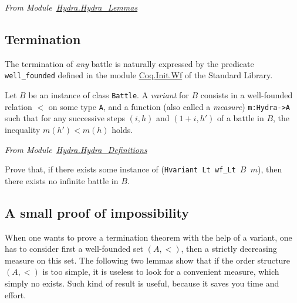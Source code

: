 \vspace{4pt}
\emph{From Module~\href{../theories/html/hydras.Hydra.Hydra_Lemmas.html\#next_round_dec}{Hydra.Hydra\_Lemmas}}



\subsection{Termination}

The termination of \emph{any}  battle is naturally expressed by the predicate \texttt{well\_founded} defined in the module \href{https://coq.inria.fr/distrib/current/stdlib/Coq.Init.Wf.html}{Coq.Init.Wf} 
 of the Standard Library.






Let $B$ be an instance of class \texttt{Battle}. A \emph{variant} for $B$ consists
in a well-founded relation $<$  on some type \texttt{A}, and a function
(also called a \emph{measure}) \texttt{m:Hydra->A} such that for any successive steps $(i,h)$ and $(1+i,h')$  of a battle in $B$, the inequality $m(h')<m(h)$ holds.


\vspace{4pt}
\emph{From Module~\href{../theories/html/hydras.Hydra.Hydra_Definitions.html\#Hvariant}{Hydra.Hydra\_Definitions}}


\label{sect:hvariant-def}





\begin{exercise}
 Prove that, if there exists some  instance of (\texttt{Hvariant Lt wf\_Lt $B$ $m$}), then there exists no infinite battle in  $B$.
\end{exercise}




\subsection{A  small proof of impossibility}

\label{omega-case}

When one wants to prove a termination theorem with the help of a variant, 
one has to consider first a well-founded set $(A,<)$, then a strictly decreasing measure on this set.  The following two lemmas show that if  the order structure $(A,<)$ is too simple, it is useless to look for a convenient measure, which simply no exists. Such kind of result is useful, because it saves you time and effort.



